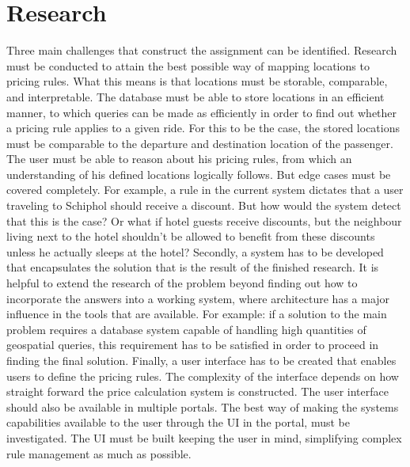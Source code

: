 \section{Research}
Three main challenges that construct the assignment can be identified. Research must be conducted to attain the best possible way of mapping locations to pricing rules. What this means is that locations must be storable, comparable, and interpretable. The database must be able to store locations in an efficient manner, to which queries can be made as efficiently in order to find out whether a pricing rule applies to a given ride. For this to be the case, the stored locations must be comparable to the departure and destination location of the passenger. The user must be able to reason about his pricing rules, from which an understanding of his defined locations logically follows. But edge cases must be covered completely. For example, a rule in the current system dictates that a user traveling to Schiphol should receive a discount. But how would the system detect that this is the case? Or what if hotel guests receive discounts, but the neighbour living next to the hotel shouldn't be allowed to benefit from these discounts unless he actually sleeps at the hotel? Secondly, a system has to be developed that encapsulates the solution that is the result of the finished research. It is helpful to extend the research of the problem beyond finding out how to incorporate the answers into a working system, where architecture has a major influence in the tools that are available. For example: if a solution to the main problem requires a database system capable of handling high quantities of geospatial queries, this requirement has to be satisfied in order to proceed in finding the final solution. Finally, a user interface has to be created that enables users to define the pricing rules. The complexity of the interface depends on how straight forward the price calculation system is constructed. The user interface should also be available in multiple portals. The best way of making the systems capabilities available to the user through the UI in the portal, must be investigated. The UI must be built keeping the user in mind, simplifying complex rule management as much as possible.

